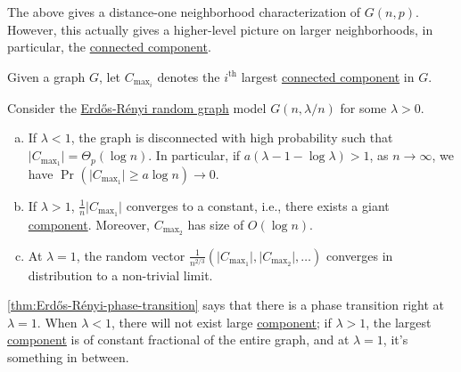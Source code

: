 The above gives a distance-one neighborhood characterization of \(G(n, p)\). However, this actually gives a higher-level picture on larger neighborhoods, in particular, the \hyperref[def:connected-component]{connected component}.

\begin{notation}
	Given a graph \(G\), let \(C_{\max _i}\) denotes the \(i^{\text{th} }\) largest \hyperref[def:connected-component]{connected component} in \(G\).
\end{notation}

\begin{theorem}\label{thm:Erdős-Rényi-phase-transition}
	Consider the \hyperref[def:Erdős-Rényi-random-graph]{Erdős-Rényi random graph} model \(G(n, \lambda / n)\) for some \(\lambda > 0\).
	\begin{enumerate}[(a)]
		\item\label{thm:Erdős-Rényi-phase-transition-a} If \(\lambda < 1\), the graph is disconnected with high probability such that \(\lvert C_{\max _1} \rvert = \Theta _p (\log n)\). In particular, if \(a (\lambda - 1 - \log \lambda ) > 1\), as \(n \to \infty \), we have \(\Pr_{}\left( \lvert C_{\max _1} \rvert \geq  a \log n \right) \to 0\).
		\item\label{thm:Erdős-Rényi-phase-transition-b} If \(\lambda > 1\), \(\frac{1}{n} \lvert C_{\max _1} \rvert \) converges to a constant, i.e., there exists a giant \hyperref[def:connected-component]{component}. Moreover, \(C_{\max _2}\) has size of \(O(\log n)\).
		\item\label{thm:Erdős-Rényi-phase-transition-c} At \(\lambda = 1\), the random vector \(\frac{1}{n^{2 / 3}} (\lvert C_{\max _1} \rvert , \lvert C_{\max _2} \rvert , \dots )\) converges in distribution to a non-trivial limit.
	\end{enumerate}
\end{theorem}

\autoref{thm:Erdős-Rényi-phase-transition} says that there is a phase transition right at \(\lambda = 1\). When \(\lambda < 1\), there will not exist large \hyperref[def:connected-component]{component}; if \(\lambda > 1\), the largest \hyperref[def:connected-component]{component} is of constant fractional of the entire graph, and at \(\lambda = 1\), it's something in between.

